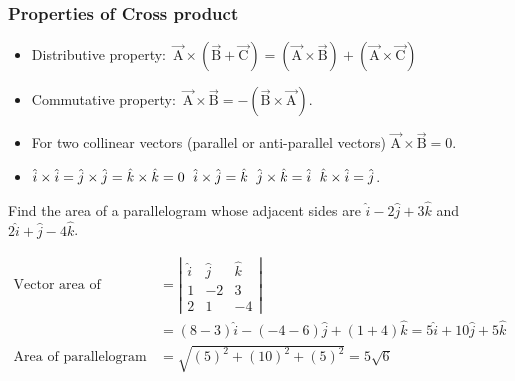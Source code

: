 \subsubsection{Properties of Cross product} 
\begin{itemize}
	\item Distributive property\hspace{0.7cm}:\ $\vec{\mathrm A} \times(\vec{\mathrm B} + \vec{\mathrm C})=(\vec{\mathrm A} \times \vec{\mathrm B})+(\vec{\mathrm A} \times \vec{\mathrm C})$
	\item Commutative property\quad:\ $\vec{\mathrm A} \times \vec{\mathrm B}=-(\vec{\mathrm B} \times \vec{\mathrm A})$.
	\item For two collinear vectors (parallel or anti-parallel vectors) $\vec{\mathrm A} \times \vec{\mathrm B}=0$.
	\item $\hat{i} \times \hat{i}=\hat{j} \times \hat{j}=\hat{k} \times \hat{k}=0\\\\
	\; \ \hat{i} \times \hat{j}=\hat{k}
	\; \ \hat{j} \times \hat{k}=\hat{i}
	\; \ \hat{k} \times \hat{i}=\hat{j}$.
	
\end{itemize}
\begin{exercise}
	Find the area of a parallelogram whose adjacent sides are $\hat{i}-2 \hat{j}+3 \hat{k}$ and
	$2 \hat{i}+\hat{j}-4 \hat{k}$.
\end{exercise}
\begin{answer}
	\begin{align*}
\text{Vector area of parellelogram}&=\left|\begin{array}{rrr}\hat{i} & \hat{j} & \hat{k} \\ 1 & -2 & 3 \\ 2 & 1 & -4\end{array}\right|\\
&=(8-3) \hat{i}-(-4-6) \hat{j}+(1+4) \hat{k}=5 \hat{i}+10 \hat{j}+5 \hat{k}\\
\text{Area of parallelogram}&=\sqrt{(5)^{2}+(10)^{2}+(5)^{2}}=5 \sqrt{6}
\end{align*}
\end{answer}


